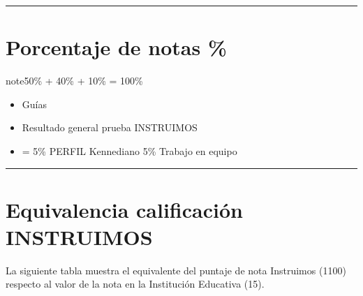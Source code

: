 \documentclass[letterpaper,10pt,spanish]{sphinxmanual}
\begin{document}
\bigskip\hrule\bigskip



\section{Porcentaje de notas \%}
\label{\detokenize{informacion:porcentaje-de-notas}}
\begin{sphinxadmonition}{note}{50\% + 40\% + 10\% = 100\%}
\begin{itemize}
\item {} 
\sphinxAtStartPar
{} Guías

\item {} 
\sphinxAtStartPar
{} Resultado general prueba INSTRUIMOS

\item {} 
\sphinxAtStartPar
{} = 5\% PERFIL Kennediano \sphinxstylestrong{+} 5\% Trabajo en equipo

\end{itemize}
\end{sphinxadmonition}


\bigskip\hrule\bigskip



\section{Equivalencia calificación INSTRUIMOS}
\label{\detokenize{informacion:equivalencia-calificacion-instruimos}}
\sphinxAtStartPar
La siguiente tabla muestra el equivalente del puntaje de nota Instruimos (1\sphinxhyphen{}100) respecto al valor de la nota en la Institución Educativa (1\sphinxhyphen{}5).
\end{document}
